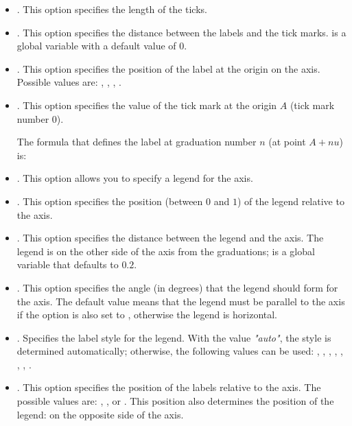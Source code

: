 \begin{itemize}
    \item {}. This option specifies the length of the ticks.

    \item {}. This option specifies the distance between the labels and the tick marks.  is a global variable with a default value of $0$.

    \item {}. This option specifies the position of the label at the origin on the axis. Possible values ​​are: , , , .

    \item {}. This option specifies the value of the tick mark at the origin $A$ (tick mark number $0$).
    
The formula that defines the label at graduation number $n$ (at point $A+nu$) is: 

    \item {}. This option allows you to specify a legend for the axis.

    \item {}. This option specifies the position (between $0$ and $1$) of the legend relative to the axis.

    \item {}. This option specifies the distance between the legend and the axis. The legend is on the other side of the axis from the graduations;  is a global variable that defaults to $0.2$.

    \item {}. This option specifies the angle (in degrees) that the legend should form for the axis. The default value  means that the legend must be parallel to the axis if the  option is also set to , otherwise the legend is horizontal.

    \item {}. Specifies the label style for the legend. With the value \emph{"auto"}, the style is determined automatically; otherwise, the following values ​​can be used: , , , , , , , .

    \item {}. This option specifies the position of the labels relative to the axis. The possible values ​​are: , , or . This position also determines the position of the legend: on the opposite side of the axis.


\end{itemize}
